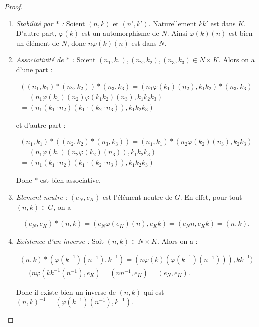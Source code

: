 \documentclass[french]{report}
\begin{document}
\begin{proof}
  \

  \begin{enumerate}
    \item \emph{Stabilité par $*$ :} Soient $(n,k)$ et $(n',k')$. Naturellement $kk'$ est dans $K$. D'autre part, $\varphi(k)$ est un automorphisme de $N$. Ainsi $\varphi(k)(n)$ est bien un élément de $N$, donc $n \varphi(k)(n)$ est dans $N$.
    \item \emph{Associativité de $*$ :} Soient $(n_1, k_1), (n_2, k_2), (n_3, k_3) \in N \times K$. Alors on a d'une part :

    \begin{gather*}
      ( (n_1, k_1) * (n_2, k_2) ) * (n_3, k_3) = (n_1 \varphi(k_1)(n_2), k_1k_2) * (n_3, k_3) \\
      = (n_1 \varphi(k_1)(n_2) \varphi(k_1 k_2)(n_3), k_1 k_2 k_3) \\
      = (n_1 (k_1 \cdot n_2) (k_1 \cdot (k_2 \cdot n_3)), k_1k_2k_3 )
    \end{gather*}

    et d'autre part :

    \begin{gather*}
      (n_1, k_1) * ( (n_2,k_2)*(n_3,k_3) ) = (n_1,k_1) * (n_2 \varphi(k_2)(n_3), k_2 k_3) \\
      = ( n_1 \varphi(k_1) (n_2 \varphi(k_2)(n_3)), k_1 k_2 k_3 ) \\
      = ( n_1(k_1 \cdot n_2)(k_1 \cdot(k_2 \cdot n_3)), k_1 k_2 k_3)
    \end{gather*}

    Donc $*$ est bien associative.

    \item \emph{Element neutre :} $(e_N, e_K)$ est l'élément neutre de $G$. En effet, pour tout $(n,k) \in G$,  on a

    \begin{gather*}
      (e_N, e_K) * (n,k) = (e_N \varphi(e_K)(n), e_K k) = (e_N n, e_K k )= (n,k).
    \end{gather*}

    \item \emph{Existence d'un inverse :} Soit $(n, k) \in N \times K$. Alors on a :

    \begin{gather*}
      (n,k) * (\varphi(k ^{-1} )(n ^{-1}) , k ^{-1} ) = (n \varphi(k)(\varphi(k ^{-1} )(n ^{-1}) )) , k k ^{-1} ) \\
      = ( n \varphi(k k ^{-1} (n ^{-1}), e_K ) = (n n ^{-1} , e_K) = (e_N, e_K).
    \end{gather*}

    Donc il existe bien un inverse de $(n, k)$ qui est $(n, k) ^{-1} = (\varphi(k ^{-1} )(n ^{-1} ), k ^{-1} ) $.
  \end{enumerate}
\end{proof}
\end{document}
